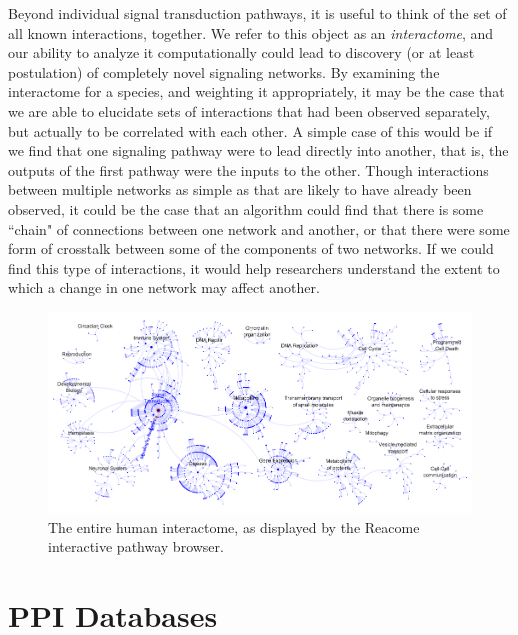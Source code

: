 \documentclass[12pt,twoside]{reedthesis}
\theoremstyle{definition}
\begin{document}
Beyond individual signal transduction pathways, it is useful to think of the set of all known interactions, together. We refer to this object as an \textit{interactome}, and our ability to analyze it computationally could lead to discovery (or at least postulation) of completely novel signaling networks. By examining the interactome for a species, and weighting it appropriately, it may be the case that we are able to elucidate sets of interactions that had been observed separately, but actually to be correlated with each other. A simple case of this would be if we find that one signaling pathway were to lead directly into another, that is, the outputs of the first pathway were the inputs to the other. Though interactions between multiple networks as simple as that are likely to have already been observed, it could be the case that an algorithm could find that there is some ``chain" of connections between one network and another, or that there were some form of crosstalk between some of the components of two networks. If we could find this type of interactions, it would help researchers understand the extent to which a change in one network may affect another.\par

\begin{figure}[h]
  \begin{center}
    \includegraphics[width=\textwidth]{human_interactome}
  \caption[Human interactome]{The entire human interactome, as displayed by the Reacome interactive pathway browser.}
  \label{fig:human_interactome}
  \end{center}
\end{figure}

\section{PPI Databases}
\end{document}
